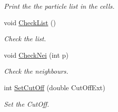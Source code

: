 \begin{DoxyCompactItemize}
\begin{DoxyCompactList}\small\item\em \-Print the the particle list in the cells. \end{DoxyCompactList}\item 
\hypertarget{classDomDecBasics_a4e589206ab9bc4752d547111d6bba6e7}{void \hyperlink{classDomDecBasics_a4e589206ab9bc4752d547111d6bba6e7}{\-Check\-List} ()}\label{classDomDecBasics_a4e589206ab9bc4752d547111d6bba6e7}

\begin{DoxyCompactList}\small\item\em \-Check the list. \end{DoxyCompactList}\item 
\hypertarget{classDomDecBasics_ad6d4b1b657a39ed64c2c45d4706dbcc1}{void \hyperlink{classDomDecBasics_ad6d4b1b657a39ed64c2c45d4706dbcc1}{\-Check\-Nei} (int p)}\label{classDomDecBasics_ad6d4b1b657a39ed64c2c45d4706dbcc1}

\begin{DoxyCompactList}\small\item\em \-Check the neighbours. \end{DoxyCompactList}\item 
int \hyperlink{classDomDecBasics_aa1b1f1f1104d2124962ffbdec630f830}{\-Set\-Cut\-Off} (double \-Cut\-Off\-Ext)
\begin{DoxyCompactList}\small\item\em \-Set the \-Cut\-Off. \end{DoxyCompactList}\end{DoxyCompactItemize}
